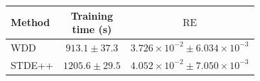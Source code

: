 \begin{tabular}{@{}lcc@{}}
    \toprule
    Method & \shortstack{Training\\time (s)} & $\operatorname{RE}$ \\
    \midrule
    WDD & $913.1 \pm 37.3$ & $3.726 \times 10^{-2} \pm 6.034 \times 10^{-3}$ \\
    STDE++ & $1205.6 \pm 29.5$ & $4.052 \times 10^{-2} \pm 7.050 \times 10^{-3}$ \\
    \bottomrule
\end{tabular}
